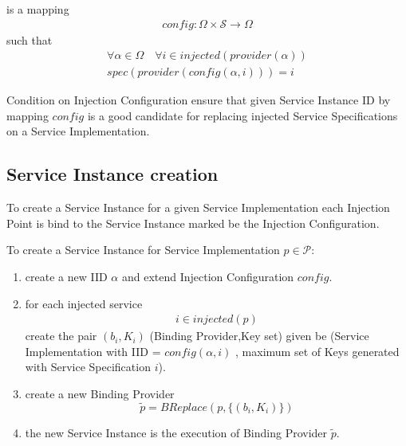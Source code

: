 \begin{defi}
  is a mapping
\begin{eqnarray}
config : \Omega \times \mathcal{S} \rightarrow \Omega
\end{eqnarray}
such that
\begin{eqnarray}
\forall \alpha \in \Omega \quad \forall i \in injected(provider(\alpha)) \nonumber\\ 
spec(provider(config(\alpha,i))) = i
\end{eqnarray}
\end{defi}


Condition on Injection Configuration ensure that given Service Instance ID by mapping $config$ is a good candidate for replacing injected Service Specifications on a Service Implementation.



\subsection{Service Instance creation}

To create a Service Instance for a given Service Implementation each Injection Point is bind to the Service Instance marked be the Injection Configuration.

\begin{defi}
  To create a Service Instance for Service Implementation $p\in\mathcal{P}$:
  \begin{enumerate}
   \item create a new IID $\alpha$ and extend Injection Configuration $config$.
   \item for each injected service
\begin{eqnarray}
i \in injected(p) \nonumber
\end{eqnarray}
    create the pair $(b_i,K_i)$ (Binding Provider,Key set) given be (Service Implementation with IID = $config(\alpha,i)$ , maximum set of Keys generated with Service Specification $i$).
   \item create a new Binding Provider
\begin{equation}
  \tilde{p} = BReplace(p,\{(b_i,K_i)\}) \nonumber
\end{equation}
  \item the new Service Instance is the execution of Binding Provider $\tilde{p}$.
  \end{enumerate}
\end{defi}


